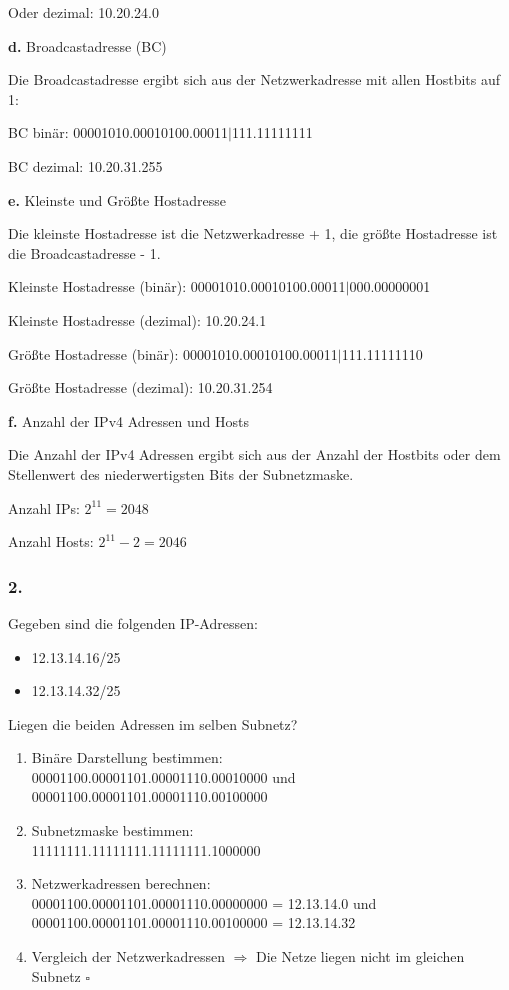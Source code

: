 Oder dezimal: 10.20.24.0

\textbf{d.} Broadcastadresse (BC)

Die Broadcastadresse ergibt sich aus der Netzwerkadresse mit allen Hostbits auf 1:

BC binär: 00001010.00010100.00011$|$111.11111111

BC dezimal: 10.20.31.255

\textbf{e.} Kleinste und Größte Hostadresse

Die kleinste Hostadresse ist die Netzwerkadresse + 1, die größte Hostadresse ist die Broadcastadresse - 1.

Kleinste Hostadresse (binär): 00001010.00010100.00011$|$000.00000001

Kleinste Hostadresse (dezimal): 10.20.24.1

Größte Hostadresse (binär): 00001010.00010100.00011$|$111.11111110

Größte Hostadresse (dezimal): 10.20.31.254

\textbf{f.} Anzahl der IPv4 Adressen und Hosts

Die Anzahl der IPv4 Adressen ergibt sich aus der Anzahl der Hostbits oder dem Stellenwert des niederwertigsten Bits der Subnetzmaske.

Anzahl IPs: $2^{11} = 2048$

Anzahl Hosts: $2^{11} - 2 = 2046$

\subsubsection{2.}

Gegeben sind die folgenden IP-Adressen:

\begin{itemize}
    \item 12.13.14.16/25
    \item 12.13.14.32/25
\end{itemize}

Liegen die beiden Adressen im selben Subnetz?

\begin{enumerate}
    \item Binäre Darstellung bestimmen: \\ 00001100.00001101.00001110.00010000 und \\ 00001100.00001101.00001110.00100000
    \item Subnetzmaske bestimmen: \\ 11111111.11111111.11111111.1000000
    \item Netzwerkadressen berechnen: \\ 00001100.00001101.00001110.00000000 = 12.13.14.0 und \\ 00001100.00001101.00001110.00100000 = 12.13.14.32
    \item Vergleich der Netzwerkadressen $\Rightarrow$ Die Netze liegen nicht im gleichen Subnetz $\square$
\end{enumerate}